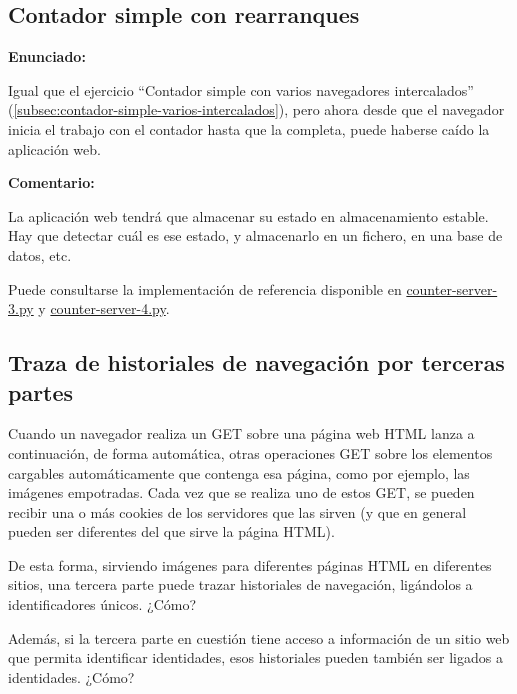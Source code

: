 \subsection{Contador simple con rearranques}
\label{subsec:contador-simple-rearranques}

\textbf{Enunciado:}

Igual que el ejercicio ``Contador simple con varios navegadores intercalados'' (\ref{subsec:contador-simple-varios-intercalados}), pero ahora desde que el navegador inicia el trabajo con el contador hasta que la completa, puede haberse caído la aplicación web.

\textbf{Comentario:}

La aplicación web tendrá que  almacenar su estado en almacenamiento estable. Hay que detectar cuál es ese estado, y almacenarlo en  un fichero, en  una base de datos, etc.

Puede consultarse la implementación de referencia disponible en
\href{https://github.com/CursosWeb/Code/blob/master/Python-Web/counter/counter-server-3.py}{counter-server-3.py} y
\href{https://github.com/CursosWeb/Code/blob/master/Python-Web/counter/counter-server-4.py}{counter-server-4.py}.


\subsection{Traza de historiales de navegación por terceras partes}
\label{subsec:navegacion-terceras-partes}

Cuando un navegador realiza un GET sobre una página web HTML lanza a continuación, de forma automática, otras operaciones GET sobre los elementos cargables automáticamente que contenga esa página, como por ejemplo, las imágenes empotradas. Cada vez que se realiza uno de estos GET, se pueden recibir una o más cookies de los servidores que las sirven (y que en general pueden ser diferentes del que sirve la página HTML).

De esta forma, sirviendo imágenes para diferentes páginas HTML en diferentes sitios, una tercera parte puede trazar historiales de navegación, ligándolos a identificadores únicos. ¿Cómo?

Además, si la tercera parte en cuestión tiene acceso a información de un sitio web que permita identificar identidades, esos historiales pueden también ser ligados a identidades. ¿Cómo?

